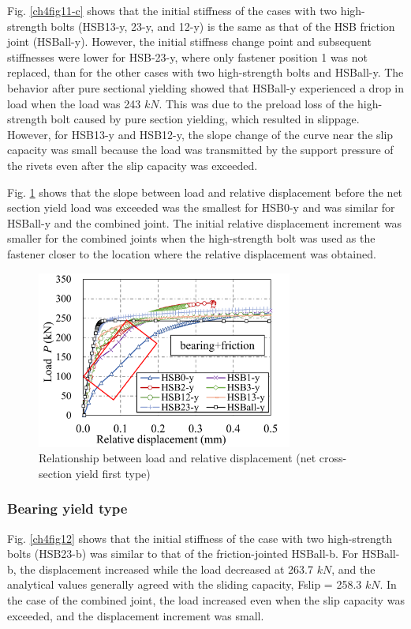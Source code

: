 Fig. \ref{ch4fig11-c} shows that the initial stiffness of the cases with two high-strength bolts (HSB13-y, 23-y, and 12-y) is the same as that of the HSB friction joint (HSBall-y). However, the initial stiffness change point and subsequent stiffnesses were lower for HSB-23-y, where only fastener position 1 was not replaced, than for the other cases with two high-strength bolts and HSBall-y. The behavior after pure sectional yielding showed that HSBall-y experienced a drop in load when the load was 243 $kN$. This was due to the preload loss of the high-strength bolt caused by pure section yielding, which resulted in slippage. However, for HSB13-y and HSB12-y, the slope change of the curve near the slip capacity was small because the load was transmitted by the support pressure of the rivets even after the slip capacity was exceeded.

Fig. \ref{ch4fig13} shows that the slope between load and relative displacement before the net section yield load was exceeded was the smallest for HSB0-y and was similar for HSBall-y and the combined joint. The initial relative displacement increment was smaller for the combined joints when the high-strength bolt was used as the fastener closer to the location where the relative displacement was obtained.

\begin{figure}[htbp]
    \centering
    \includegraphics[width=0.75\textwidth]{imgs/ch4/fig13.pdf}
    \caption{Relationship between load and relative displacement (net cross-section yield first type)}
    \label{ch4fig13}
\end{figure}

\subsubsection{Bearing yield type}

Fig. \ref{ch4fig12} shows that the initial stiffness of the case with two high-strength bolts (HSB23-b) was similar to that of the friction-jointed HSBall-b. For HSBall-b, the displacement increased while the load decreased at 263.7 $kN$, and the analytical values generally agreed with the sliding capacity, Fslip  = 258.3 $kN$. In the case of the combined joint, the load increased even when the slip capacity was exceeded, and the displacement increment was small.

